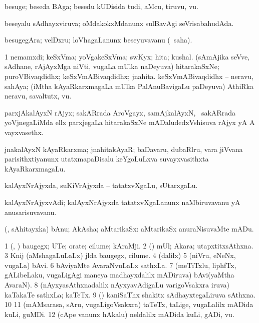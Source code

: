 {{{\bentry
{} 
\gl{\nA}
\expl{}
\bmng
besuge; beseda BAga; besedu kUDisida tudi, aMcu, tiruvu, \mo vu. 
\emng
\eentry

\bentry
{} 
\gl{\gu}
\expl{}
\bmng
beseyalu sAdhayxviruva; oMdakokxMdanunx sulBavAgi seVrisabahudAda. 
\emng
\eentry

\bentry
{} 
\gl{\nA}
\expl{}
\bmng
besugegAra; velDxru; loVhagaLanunx beseyuvavanu (\rUpa\ saha). 
\emng
\eentry

\bentry
{} 
\gl{\nA}
\expl{}
\bmng
\bnum
\num{1} nemamxdi; keSxVma; yoVgakeSxVma; swKyx; hita; kushal. 
  
\banum
{} (sAmAjika seVve, sAdhane, rAjAyxMga niVti, \mo vugaLa mUlka naDeyuva) hitarakaSxNe; puroVBivaqdidhx; keSxVmABivaqdidhx; jnahita. 
 keSxVmABivaqdidhx -- neravu, sahAya; (iMtha kAyaRkarxmagaLa mUlka PalAnuBavigaLu paDeyuva) AthiRka neravu, savaltutx, \mo vu. 
\eanum
\numie
\enum
\emng
\eentry

\bentry
{} 
\gl{\nA}
\expl{}
\bmng
parxjAkalAyxN rAjyx; sakARrada AroVgayx, samAjkalAyxN, \mo\ sakARrada yoVjnegaLiMda ellx parxjegaLa hitarakaSxNe mADaludedxVshisuva rAjyx yA A vayxvasethx. 
\emng
\eentry

\bentry
{} 
\gl{\nA}
\expl{}
\bmng
jnakalAyxN kAyaRkarxma; jnahitakAyaR; baDavaru, dubaRlru, \mo vara jiVvana parisithxtiyanunx utatxmapaDisalu keYgoLuLxva suvayxvasithxta kAyaRkarxmagaLu. 
\emng
\eentry

\bentry
{} 
\gl{\nA}
\expl{}
\bmng
kalAyxNrAjyxda, suKiVrAjyxda -- tatatxvXgaLu, sUtarxgaLu. 
\emng
\eentry

\bentry
{} 
\gl{\nA}
\expl{}
\bmng
kalAyxNrAjyxvAdi; kalAyxNrAjyxda tatatxvXgaLanunx naMbiruvavanu yA anusarisuvavanu. 
\emng
\eentry

\bentry
{} 
\gl{\nA}
\expl{}
\bmng
(\kAparx, sAhitayxka) bAnu; AkAsha; aMtarikaSx:  aMtarikaSx anuraNisuvaMte mADu. 
\emng
\eentry

\bentry
{} 
\gl{\nA}
\expl{}
\bmng
\bnum
\num{1} (\kAparx, \pArxparx) baugegx; UTe; orate; cilume; kAraMji. 
\num{2} (\rUpa) mUl; Akara; utapxtitxsAthxna. 
\num{3} Knij (aMshagaLuLaLx) jlda baugegx, cilume. 
\num{4} (\bava dalilx)  
\num{5} (niVru, eNeNx, \mo vugaLa) bAvi. 
\num{6} bAviyaMte AvaraNvuLaLx sathxLa. 
\num{7} (meTiTxlu, liphfTx, gALibeLaku, \mo vugaLigAgi maneya madhayxdalilx mADiruva) bAvi(yaMtha AvaraN). 
\num{8} (nAyxyasAthxnadalilx nAyxyavAdigaLu \mo varigoVsakxra iruva) kaTakaTe sathxLa; kaTeTx. 
\num{9} (\Bwvi) kaniSaThx shakitx sAdhayxtegaLiruva sAthxna. 
\num{10}  
\num{11} (mAMsarasa, sAru, \mo vugaLigoVsakxra) taTeTx, taLige, \mo vugaLalilx mADida kuLi, guMDi. 
\num{12} (cApe \mo vanunx hAkalu) neldalilx mADida kuLi, gADi, \mo vu. 
\enum
\emng

}}}
